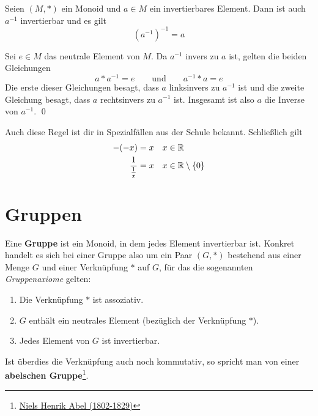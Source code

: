 \begin{sat} \label{doppelinvers}
Seien $(M,*)$ ein Monoid und $a\in M$ ein invertierbares Element. Dann ist auch $a^{-1}$ invertierbar und es gilt
\[ (a^{-1})^{-1} = a \]
\end{sat}
\begin{bew}
Sei $e\in M$ das neutrale Element von $M$. Da $a^{-1}$ invers zu $a$ ist, gelten die beiden Gleichungen
\[ a*a^{-1} = e \qquad\text{und}\qquad a^{-1}*a=e \]
Die erste dieser Gleichungen besagt, dass $a$ linksinvers zu $a^{-1}$ ist und die zweite Gleichung besagt, dass $a$ rechtsinvers zu $a^{-1}$ ist. Insgesamt ist also $a$ die Inverse von $a^{-1}$. \qed
\end{bew}


\begin{bem}
 Auch diese Regel ist dir in Spezialfällen aus der Schule bekannt. Schließlich gilt
 \begin{align*}
  -(-x) & = x && x\in {\mathbb R} \\
  \frac{1}{\frac{1}{x}} & = x && x\in {\mathbb R}\setminus \{0\}
 \end{align*}
\end{bem}





\section{Gruppen}

\begin{de}[Gruppe]
Eine \textbf{Gruppe} ist ein Monoid, in dem jedes Element invertierbar ist. Konkret handelt es sich bei einer Gruppe also um ein Paar $(G,*)$ bestehend aus einer Menge $G$ und einer Verknüpfung $*$ auf $G$, für das die sogenannten \emph{Gruppenaxiome} gelten:
\begin{enumerate}[(G1)]
 \item Die Verknüpfung $*$ ist assoziativ.
 \item $G$ enthält ein neutrales Element (bezüglich der Verknüpfung $*$).
 \item Jedes Element von $G$ ist invertierbar.
\end{enumerate}
Ist überdies die Verknüpfung auch noch kommutativ, so spricht man von einer \textbf{abelschen Gruppe}\footnote{\href{https://de.wikipedia.org/wiki/Niels_Henrik_Abel}{Niels Henrik Abel (1802-1829)}}.
\end{de}





